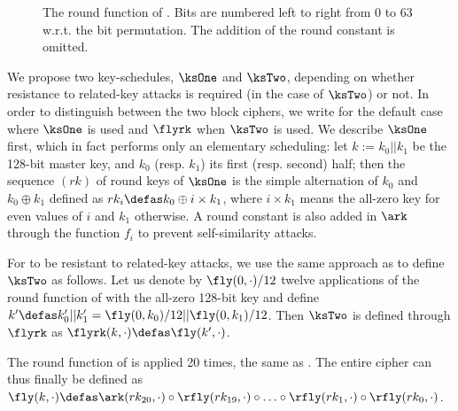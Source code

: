\begin{figure}[ht]
\centering

\caption[The round function of \fly.]{The round function of \fly.\label{fig:fly_spn} Bits are numbered left to right from 0 to 63 w.r.t. the bit permutation. The addition of the round constant is
omitted.}
\end{figure}

\medskip


We propose two key-schedules, $\ksOne$ and $\ksTwo$, depending on whether resistance to related-key attacks is required (in the case of $\ksTwo$) or not.
In order to distinguish between the two block ciphers, we write \fly for the default case where $\ksOne$ is used and $\flyrk$ when $\ksTwo$ is used.
We describe $\ksOne$ first, which in fact performs only an elementary scheduling:
let $k := k_0||k_1$ be the 128-bit master key, and $k_0$ (resp. $k_1$) its first (resp. second) half; then
the sequence $(rk)$ of round keys of $\ksOne$ is the simple alternation of $k_0$ and $k_0 \oplus k_1$ defined as $rk_i \defas k_0 \oplus i\times k_1$, where
$i\times k_1$
means the all-zero key for even values of $i$ and $k_1$ otherwise.
A round constant is also added in $\ark$ through the function $f_i$ to prevent self-similarity attacks.

\medskip

For \fly to be resistant to related-key attacks, we use the same approach as \noekeon \cite{noekeon} to define $\ksTwo$ as follows. Let us denote by $\fly(0, \cdot)/12$ twelve applications of the round function of \fly
with the all-zero 128-bit key and define $k' \defas k_0'||k_1' = \fly(0, k_0)/12||\fly(0, k_1)/12$. Then $\ksTwo$ is defined through $\flyrk$ as $\flyrk(k, \cdot) \defas \fly(k', \cdot)$.

\medskip

The round function of \fly is applied 20 times, the same as \pride. The entire cipher can thus finally be defined
as $\fly(k,\cdot) \defas \ark(rk_{20},\cdot) \circ \rfly(rk_{19}, \cdot) \circ \ldots \circ \rfly(rk_1, \cdot) \circ \rfly(rk_0,\cdot)$.


